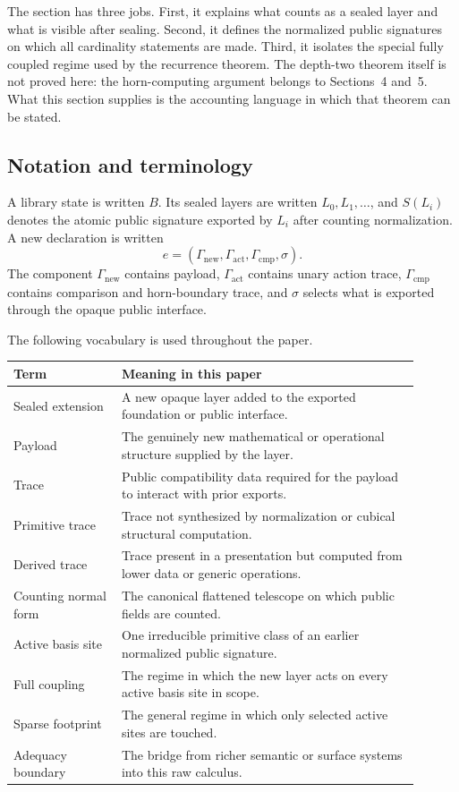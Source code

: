 \documentclass{lmcs}
\begin{document}
The section has three jobs.  First, it explains what counts as a sealed layer and what is
visible after sealing.  Second, it defines the normalized public signatures on which all
cardinality statements are made.  Third, it isolates the special fully coupled regime used by
the recurrence theorem.  The depth-two theorem itself is not proved here: the horn-computing
argument belongs to Sections~4 and~5.  What this section supplies is the accounting language
in which that theorem can be stated.

\subsection{Notation and terminology}

A library state is written \(B\).  Its sealed layers are written \(L_0,L_1,\ldots\), and
\(S(L_i)\) denotes the atomic public signature exported by \(L_i\) after counting
normalization.  A new declaration is written
\[
  e=(\Gamma_{\mathrm{new}},\Gamma_{\mathrm{act}},\Gamma_{\mathrm{cmp}},\sigma).
\]
The component \(\Gamma_{\mathrm{new}}\) contains payload, \(\Gamma_{\mathrm{act}}\) contains
unary action trace, \(\Gamma_{\mathrm{cmp}}\) contains comparison and horn-boundary trace, and
\(\sigma\) selects what is exported through the opaque public interface.

The following vocabulary is used throughout the paper.

\begin{center}
\begin{tabular}{p{0.24\linewidth}p{0.66\linewidth}}
\hline
Term & Meaning in this paper \\
\hline
Sealed extension & A new opaque layer added to the exported foundation or public interface. \\
Payload & The genuinely new mathematical or operational structure supplied by the layer. \\
Trace & Public compatibility data required for the payload to interact with prior exports. \\
Primitive trace & Trace not synthesized by normalization or cubical structural computation. \\
Derived trace & Trace present in a presentation but computed from lower data or generic operations. \\
Counting normal form & The canonical flattened telescope on which public fields are counted. \\
Active basis site & One irreducible primitive class of an earlier normalized public signature. \\
Full coupling & The regime in which the new layer acts on every active basis site in scope. \\
Sparse footprint & The general regime in which only selected active sites are touched. \\
Adequacy boundary & The bridge from richer semantic or surface systems into this raw calculus. \\
\hline
\end{tabular}
\end{center}
\end{document}
